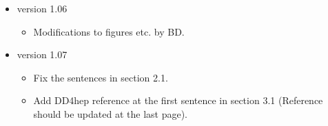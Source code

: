 \begin{itemize}
\item version 1.06
\begin{itemize}
\item Modifications to figures etc. by BD. 
\end{itemize}

\item version 1.07
\begin{itemize}
\item Fix the sentences in section 2.1.
\item Add DD4hep reference at the first sentence in section 3.1 (Reference should be updated at the last page). 
\end{itemize}

\end{itemize}

\clearpage

